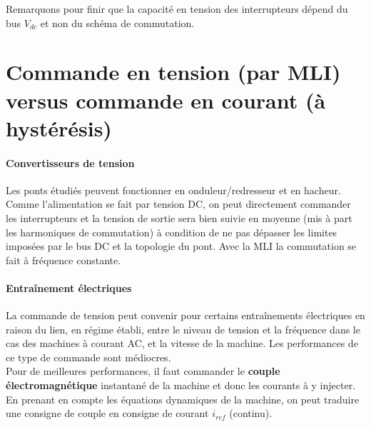 		Remarquons pour finir que la capacité en tension des interrupteurs dépend du bus $V_{dc}$ et non du schéma de commutation. 
		
\section{Commande en tension (par MLI) versus commande en courant (à hystérésis)}
	\paragraph{Convertisseurs de tension}\quad 
	Les ponts étudiés peuvent fonctionner en onduleur/redresseur et en hacheur. Comme l'alimentation se fait par tension DC, on peut directement commander les interrupteurs et la tension de sortie sera bien suivie en moyenne (mis à part les harmoniques de commutation) à condition de ne pas dépasser les limites imposées par le bus DC et la topologie du pont. Avec la MLI la commutation se fait à fréquence constante. 
	
	\paragraph{Entraînement électriques} \quad 
	La commande de tension peut convenir pour certains entraînements électriques en raison du lien, en régime établi, entre le niveau de tension et la fréquence dans le cas des machines à courant AC, et la vitesse de la machine. Les performances de ce type de commande sont médiocres. \\
	
	Pour de meilleures performances, il faut commander le \textbf{couple électromagnétique} instantané de la machine et donc les courants à y injecter. En prenant en compte les équations dynamiques de la machine, on peut traduire une consigne de couple en consigne de courant $i_{ref}$ (continu).
	
